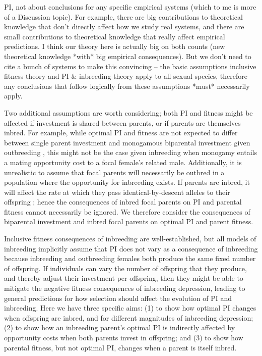 \documentclass[12pt]{article}
\begin{document}
PI, not about conclusions for any specific empirical systems (which to me is more of a Discussion topic). For example, there are big contributions to theoretical knowledge that don't directly affect how we study real systems, and there are small contributions to theoretical knowledge that really affect empirical predictions. I think our theory here is actually big on both counts (new theoretical knowledge *with* big empirical consequences). But we don't need to cite a bunch of systems to make this convincing -- the basic assumptions inclusive fitness theory and PI & inbreeding theory apply to all sexual species, therefore any conclusions that follow logically from these assumptions *must* necessarily apply. 

Two additional assumptions are worth considering; both PI and fitness might be affected if investment is shared between parents, or if parents are themselves inbred. For example, while optimal PI and fitness are not expected to differ between single parent investment and monogamous biparental investment given outbreeding \cite[][]{Parker1985}, this might not be the case given inbreeding when monogamy entails a mating opportunity cost \cite[][]{Waser1986} to a focal female's related male. Additionally, it is unrealistic to assume that focal parents will necessarily be outbred in a population where the opportunity for inbreeding exists. If parents are inbred, it will affect the rate at which they pass identical-by-descent alleles to their offspring \cite[e.g.,][]{Duthie2015a}; hence the consequences of inbred focal parents on PI and parental fitness cannot necessarily be ignored. We therefore consider the consequences of biparental investment and inbred focal parents on optimal PI and parent fitness.

Inclusive fitness consequences of inbreeding are well-established, but all models of inbreeding implicitly assume that PI does not vary as a consequence of inbreeding because inbreeding and outbreeding females both produce the same fixed number of offspring. If individuals can vary the number of offspring that they produce, and thereby adjust their investment per offspring, then they might be able to mitigate the negative fitness consequences of inbreeding depression, leading to general predictions for how selection should affect the evolution of PI and inbreeding. Here we have three specific aims: (1) to show how optimal PI changes when offspring are inbred, and for different magnitudes of inbreeding depression; (2) to show how an inbreeding parent's optimal PI is indirectly affected by opportunity costs when both parents invest in offspring; and (3) to show how parental fitness, but not optimal PI, changes when a parent is itself inbred.
\end{document}
